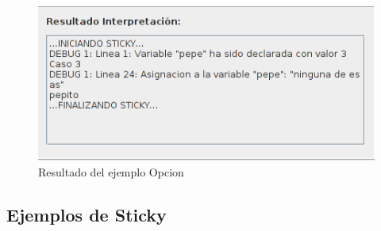 \documentclass[a4paper, 12pt]{book}
\begin{document}
\begin{itemize}
\begin{figure}[htb]
  \centerline{\includegraphics[width=\textwidth]{./imagenes/opcion-resultado.png}}
  \caption{Resultado del ejemplo Opcion}
\end{figure}



\end{itemize} %
\subsection{Ejemplos de Sticky}
\end{document}
